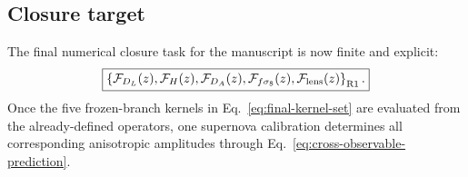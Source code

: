 \subsection{Closure target}

The final numerical closure task for the manuscript is now finite and
explicit:
\begin{equation}
\boxed{
\left\{
\mathcal F_{D_L}(z),
\mathcal F_H(z),
\mathcal F_{D_A}(z),
\mathcal F_{f\sigma_8}(z),
\mathcal F_{\rm lens}(z)
\right\}_{\rm R1}.
}
\label{eq:final-kernel-set}
\end{equation}
Once the five frozen-branch kernels in
Eq.~\eqref{eq:final-kernel-set} are evaluated from the already-defined
operators, one supernova calibration determines all corresponding
anisotropic amplitudes through
Eq.~\eqref{eq:cross-observable-prediction}.
